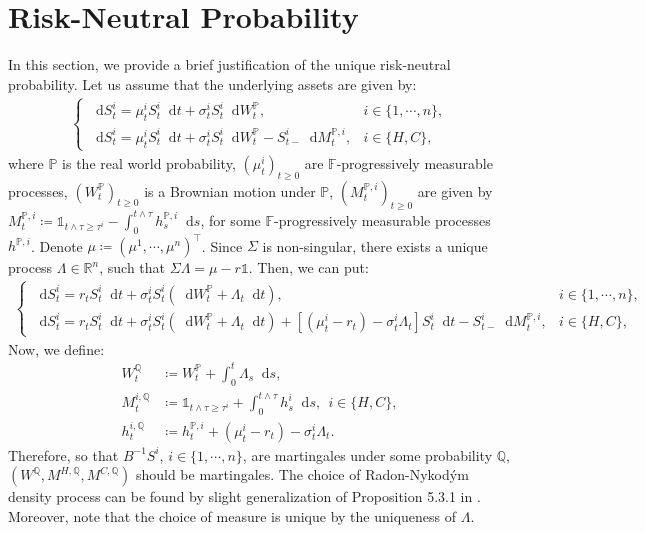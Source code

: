 \documentclass[a4paper, 11pt]{article}              %
\numberwithin{equation}{section}
\theoremstyle{plain}
\newcommand{\1}{\mathds{1}}
\newcommand{\dsF}{\mathbb{F}}
\newcommand{\dsQ}{\mathbb{Q}}
\newcommand{\dsP}{\mathbb{P}}
\newcommand{\dsR}{\mathbb{R}}
\theoremstyle{plain}
\theoremstyle{definition}
\theoremstyle{plain}
\newcommand*\df{\mathop{}\!\mathrm{d}}
\begin{document}
\section{Risk-Neutral Probability}
\label{sec:risk-neutral}
In this section, we provide a brief justification of the unique risk-neutral
probability. Let us assume that the underlying assets are given by:
\begin{align}\label{app:sde1}
  \begin{cases}
    \df S^i_t = \mu^i_tS_t^i\df t + \sigma^i_tS^i_t \df W^\dsP_t,  &i \in \{1, \cdots, n\},\\
    \df S^i_t = \mu^i_tS_t^i\df t + \sigma^i_tS^i_t \df W^\dsP_t-S^i_{t-}\df M^{\dsP, i}_t,
    &i \in \{H, C\},
  \end{cases}
\end{align}
where $\dsP$ is the real world probability, $(\mu^i_t)_{t\geq0}$ are
$\dsF$-progressively measurable processes, $(W^\dsP_t)_{t\geq0}$ is a Brownian motion
under $\dsP$, $(M^{\dsP, i}_t)_{t\geq0}$ are given by
$M^{\dsP, i}_t \coloneqq \1_{t\wedge \tau \geq \tau^i} - \int_{0}^{t \wedge \tau}h^{\dsP, i}_s\df s $,
for some $\dsF$-progressively measurable processes $h^{\dsP, i}$. Denote
$\mu \coloneqq (\mu^1, \cdots, \mu^n)^\top$. Since $\Sigma$ is non-singular, there exists a unique
process $\Lambda\in \dsR^n$, such that $\Sigma\Lambda = \mu - r\1$. Then, we can put:
\begin{align}\label{app:sde2}
  \begin{cases}
    \df S^i_t = r_tS_t^i\df t + \sigma^i_t S^i_t(\df W^\dsP_t+\Lambda_t \df t),  &i \in \{1, \cdots, n\},\\
    \df S^i_t = r_tS^i_t\df t
    +\sigma^i_tS^i_t (\df W^\dsP_t + \Lambda_t\df t)+[(\mu^i_t-r_t)-\sigma^i_t\Lambda_t]S_t^i\df t  -S^i_{t-}\df M^{\dsP, i}_t,
    &i \in \{H, C\},
  \end{cases}
\end{align}
Now, we define:
\begin{align} 
  W^{\dsQ}_t &\coloneqq W^{\dsP}_t + \int_{0}^{t}\Lambda_s \df s,
  \nonumber\\
  M^{i, \dsQ}_t &\coloneqq \1_{t \wedge \tau \geq \tau^i} + \int_{0}^{t \wedge \tau}h^i_s \df s,~~i \in \{H, C\},\nonumber\\
  h^{i, \dsQ}_t &\coloneqq h^{\dsP, i}_t+(\mu^i_t-r_t)-\sigma^i_t\Lambda_t.
\end{align}
Therefore, so that $B^{-1}S^i$, $i \in \{1, \cdots, n\}$, are martingales under some
probability $\dsQ$, $(W^{\dsQ}, M^{H, \dsQ}, M^{C, \dsQ})$ should be martingales. The choice of
Radon-Nykod\'ym density process can be found by slight generalization of
Proposition 5.3.1 in \cite{bielecki2010credit}. Moreover, note that the choice
of measure is unique by the uniqueness of $\Lambda$.
\end{document}
